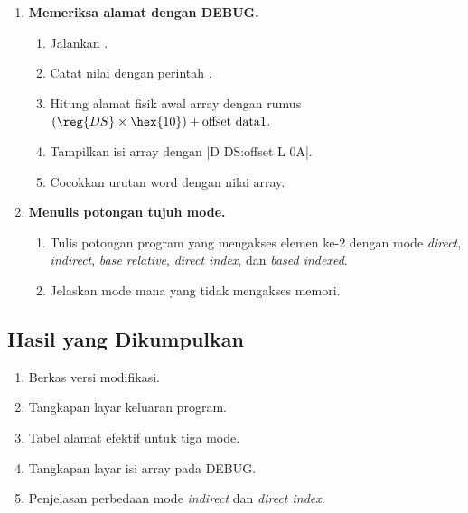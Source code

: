 \begin{enumerate}
    \item \textbf{Memeriksa alamat dengan DEBUG.}
    \begin{enumerate}
        \item Jalankan .
        \item Catat nilai  dengan perintah .
        \item Hitung alamat fisik awal array dengan rumus
              $(\reg{DS} \times \hex{10}) + \text{offset data1}$.
        \item Tampilkan isi array dengan
              \lstasm|D DS:offset L 0A|.
        \item Cocokkan urutan word dengan nilai array.
    \end{enumerate}

    \item \textbf{Menulis potongan tujuh mode.}
    \begin{enumerate}
        \item Tulis potongan program yang mengakses elemen ke-2
              dengan mode \textit{direct}, \textit{indirect},
              \textit{base relative}, \textit{direct index}, dan
              \textit{based indexed}.
        \item Jelaskan mode mana yang tidak mengakses memori.
    \end{enumerate}
\end{enumerate}

\subsection{Hasil yang Dikumpulkan}

\begin{enumerate}
    \item Berkas  versi modifikasi.
    \item Tangkapan layar keluaran program.
    \item Tabel alamat efektif untuk tiga mode.
    \item Tangkapan layar isi array pada DEBUG.
    \item Penjelasan perbedaan mode \textit{indirect} dan
          \textit{direct index}.
\end{enumerate}

